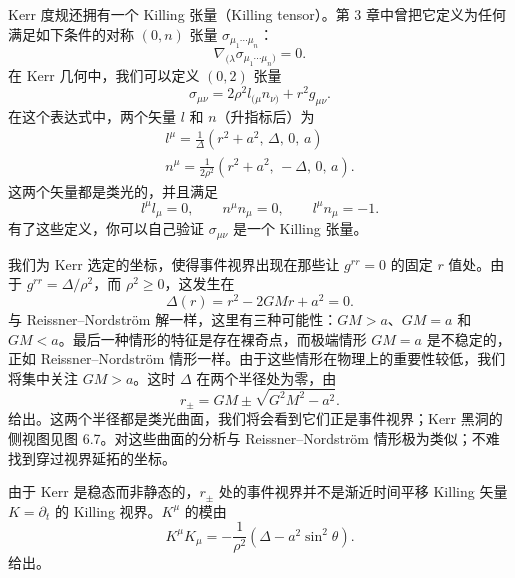 Kerr 度规还拥有一个 Killing 张量（Killing tensor）。第 3 章中曾把它定义为任何满足如下条件的对称 $(0,n)$ 张量 $\sigma_{\mu_{1}\cdots\mu_{n}}$：
\begin{equation*}
\nabla_{(\lambda}\sigma_{\mu_{1}\cdots\mu_{n})} = 0.
\tag{6.77}
\end{equation*}
在 Kerr 几何中，我们可以定义 $(0,2)$ 张量
\begin{equation*}
\sigma_{\mu\nu} = 2\rho^{2}l_{(\mu}n_{\nu)} + r^{2}g_{\mu\nu}.
\tag{6.78}
\end{equation*}
在这个表达式中，两个矢量 $l$ 和 $n$（升指标后）为
\begin{gather*}
l^{\mu} = \frac{1}{\Delta}\left(r^{2}+a^{2},\, \Delta,\, 0,\, a\right)\\
n^{\mu} = \frac{1}{2\rho^{2}}\left(r^{2}+a^{2},\, -\Delta,\, 0,\, a\right).
\tag{6.79}
\end{gather*}
这两个矢量都是类光的，并且满足
\begin{equation*}
l^{\mu}l_{\mu} = 0,\qquad n^{\mu}n_{\mu} = 0,\qquad l^{\mu}n_{\mu} = -1.
\tag{6.80}
\end{equation*}
有了这些定义，你可以自己验证 $\sigma_{\mu\nu}$ 是一个 Killing 张量。

我们为 Kerr 选定的坐标，使得事件视界出现在那些让 $g^{rr}=0$ 的固定 $r$ 值处。由于 $g^{rr}=\Delta/\rho^{2}$，而 $\rho^{2}\geq 0$，这发生在
\begin{equation*}
\Delta(r) = r^{2} - 2GMr + a^{2} = 0.
\tag{6.81}
\end{equation*}
与 Reissner–Nordström 解一样，这里有三种可能性：$GM>a$、$GM=a$ 和 $GM<a$。最后一种情形的特征是存在裸奇点，而极端情形 $GM=a$ 是不稳定的，正如 Reissner–Nordström 情形一样。由于这些情形在物理上的重要性较低，我们将集中关注 $GM>a$。这时 $\Delta$ 在两个半径处为零，由
\begin{equation*}
r_{\pm} = GM \pm \sqrt{G^{2}M^{2}-a^{2}}.
\tag{6.82}
\end{equation*}
给出。这两个半径都是类光曲面，我们将会看到它们正是事件视界；Kerr 黑洞的侧视图见图 6.7。对这些曲面的分析与 Reissner–Nordström 情形极为类似；不难找到穿过视界延拓的坐标。

由于 Kerr 是稳态而非静态的，$r_{\pm}$ 处的事件视界并不是渐近时间平移 Killing 矢量 $K=\partial_t$ 的 Killing 视界。$K^{\mu}$ 的模由
\begin{equation*}
K^{\mu}K_{\mu} = -\frac{1}{\rho^{2}}\left(\Delta - a^{2}\sin^{2}\theta\right).
\tag{6.83}
\end{equation*}
给出。


